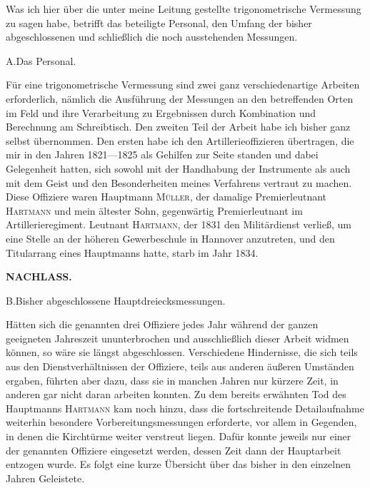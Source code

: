 \par\noindent\hspace*{\parindent}Was ich hier über die unter meine Leitung gestellte trigonometrische Vermessung zu sagen habe, betrifft das beteiligte Personal, den Umfang der bisher abgeschlossenen und schließlich die noch ausstehenden Messungen.

\begin{center}
A.\quad Das Personal.
\end{center}

\par\noindent\hspace*{\parindent}Für eine trigonometrische Vermessung sind zwei ganz verschiedenartige Arbeiten erforderlich, nämlich die Ausführung der Messungen an den betreffenden Orten im Feld und ihre Verarbeitung zu Ergebnissen durch Kombination und Berechnung am Schreibtisch. Den zweiten Teil der Arbeit habe ich bisher ganz selbst übernommen. Den ersten habe ich den Artillerieoffizieren übertragen, die mir in den Jahren 1821---1825 als Gehilfen zur Seite standen und dabei Gelegenheit hatten, sich sowohl mit der Handhabung der Instrumente als auch mit dem Geist und den Besonderheiten meines Verfahrens vertraut zu machen. Diese Offiziere waren Hauptmann \textsc{Müller}, der damalige Premierleutnant \textsc{Hartmann} und mein ältester Sohn, gegenwärtig Premierleutnant im Artillerieregiment. Leutnant \textsc{Hartmann}, der 1831 den Militärdienst verließ, um eine Stelle an der höheren Gewerbeschule in Hannover anzutreten, und den Titularrang eines Hauptmanns hatte, starb im Jahr 1834.

\par\clearpage
\noindent{}\hfill{\small\textbf{NACHLASS.}}\hfill\null\par\medskip

\begin{center}
B.\quad Bisher abgeschlossene Hauptdreiecksmessungen.
\end{center}

\par\noindent\hspace*{\parindent}Hätten sich die genannten drei Offiziere jedes Jahr während der ganzen geeigneten Jahreszeit ununterbrochen und ausschließlich dieser Arbeit widmen können, so wäre sie längst abgeschlossen. Verschiedene Hindernisse, die sich teils aus den Dienstverhältnissen der Offiziere, teils aus anderen äußeren Umständen ergaben, führten aber dazu, dass sie in manchen Jahren nur kürzere Zeit, in anderen gar nicht daran arbeiten konnten. Zu dem bereits erwähnten Tod des Hauptmanns \textsc{Hartmann} kam noch hinzu, dass die fortschreitende Detailaufnahme weiterhin besondere Vorbereitungsmessungen erforderte, vor allem in Gegenden, in denen die Kirchtürme weiter verstreut liegen. Dafür konnte jeweils nur einer der genannten Offiziere eingesetzt werden, dessen Zeit dann der Hauptarbeit entzogen wurde. Es folgt eine kurze Übersicht über das bisher in den einzelnen Jahren Geleistete.

